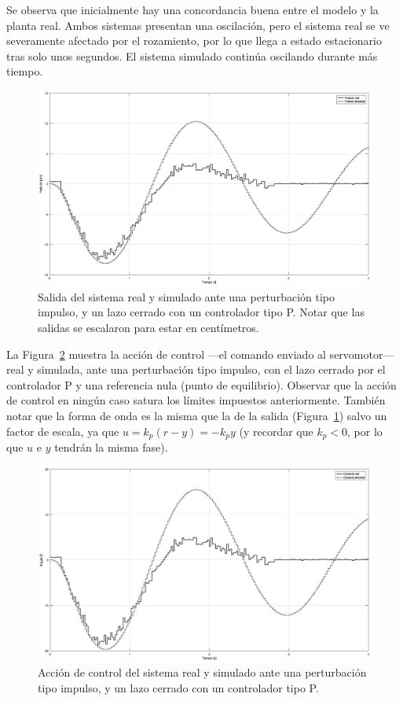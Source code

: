 Se observa que inicialmente hay una concordancia buena entre el modelo y la planta real. Ambos sistemas presentan una oscilación, pero el sistema real se ve severamente afectado por el rozamiento, por lo que llega a estado estacionario tras solo unos segundos. El sistema simulado continúa oscilando durante más tiempo.

\begin{figure}[!htbp]
    \centering
    \includegraphics[width=\linewidth]{img/p-pert-salida.eps}
    \caption{Salida del sistema real y simulado ante una perturbación tipo impulso, y un lazo cerrado con un controlador tipo P. Notar que las salidas se escalaron para estar en centímetros.}
    \label{fig:p-pert-salida}
\end{figure}

La Figura~\ref{fig:p-pert-cont} muestra la acción de control ---el comando enviado al servomotor--- real y simulada, ante una perturbación tipo impulso, con el lazo cerrado por el controlador P y una referencia nula (punto de equilibrio). Observar que la acción de control en ningún caso satura los límites impuestos anteriormente. También notar que la forma de onda es la misma que la de la salida (Figura~\ref{fig:p-pert-salida}) salvo un factor de escala, ya que $u = k_p (r - y) = -k_p y$ (y recordar que $k_p < 0$, por lo que $u$ e $y$ tendrán la misma fase).

\begin{figure}[!htbp]
    \centering
    \includegraphics[width=\linewidth]{img/p-pert-cont.eps}
    \caption{Acción de control del sistema real y simulado ante una perturbación tipo impulso, y un lazo cerrado con un controlador tipo P.}
    \label{fig:p-pert-cont}
\end{figure}

